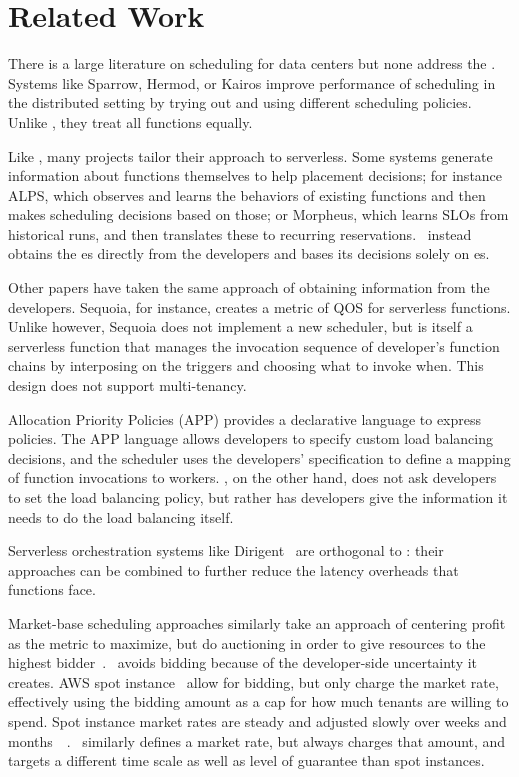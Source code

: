 \section{Related Work}

There is a large literature on scheduling for data centers but none
address the \problem.  Systems like Sparrow\cite{sparrow},
Hermod\cite{hermod}, or Kairos\cite{kairos} improve performance of
scheduling in the distributed setting by trying out and using
different scheduling policies. Unlike \sys{}, they treat all functions
equally.

Like \sys{}, many projects tailor their approach to serverless. Some systems
generate information about functions themselves to help placement decisions; for
instance ALPS\cite{alps}, which observes and learns the behaviors of existing
functions and then makes scheduling decisions based on those; or
Morpheus\cite{morpheus}, which learns SLOs from historical runs, and then
translates these to recurring reservations.~\Sys{} instead obtains the \class{}es
directly from the developers and bases its decisions solely on \class{}es.

Other papers have taken the same approach of obtaining information
from the developers. Sequoia\cite{sequoia}, for instance, creates a
metric of QOS for serverless functions. Unlike \sys{} however, Sequoia
does not implement a new scheduler, but is itself a serverless
function that manages the invocation sequence of developer's function
chains by interposing on the triggers and choosing what to invoke
when. This design does not support multi-tenancy.

Allocation Priority Policies (APP)\cite{app-paper} provides a declarative
language to express policies. The APP
language allows developers to specify custom load balancing
decisions, and the scheduler uses the developers' specification to define a
mapping of function invocations to workers. \Sys{}, on the other hand, does not
ask developers to set the load balancing policy, but rather has developers give
\sys{} the information it needs to do the load balancing itself.

Serverless orchestration systems like Dirigent~\cite{dirigent} are orthogonal to
\sys{}: their approaches can be combined to further reduce the latency overheads
that functions face.

Market-base scheduling approaches similarly take an approach of centering profit
as the metric to maximize, but do auctioning in order to give resources to the
highest bidder~\cite{bellagio-market-based,online-auctioning}.~\Sys{} avoids
bidding because of the developer-side uncertainty it creates. AWS spot
instance~\cite{spot-instance-pricing} allow for bidding, but only charge the
market rate, effectively using the bidding amount as a cap for how much tenants
are willing to spend. Spot instance market rates are steady and adjusted slowly
over weeks and months~~\cite{spot-instance-history}.~\Sys{} similarly defines a
market rate, but always charges that amount, and targets a different time scale
as well as level of guarantee than spot instances.

